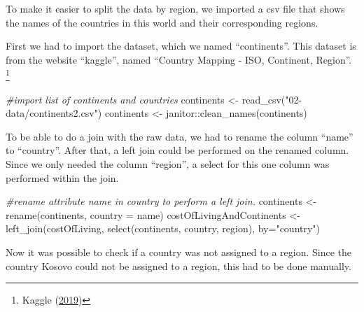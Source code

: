 \documentclass[
  11pt,
  a4paper,
  twoside]{scrbook}
\newenvironment{Shaded}{\begin{snugshade}}{\end{snugshade}}
\newcommand{\AttributeTok}[1]{\textcolor[rgb]{0.77,0.63,0.00}{#1}}
\newcommand{\CommentTok}[1]{\textcolor[rgb]{0.56,0.35,0.01}{\textit{#1}}}
\newcommand{\FunctionTok}[1]{\textcolor[rgb]{0.00,0.00,0.00}{#1}}
\newcommand{\NormalTok}[1]{#1}
\newcommand{\OtherTok}[1]{\textcolor[rgb]{0.56,0.35,0.01}{#1}}
\newcommand{\SpecialCharTok}[1]{\textcolor[rgb]{0.00,0.00,0.00}{#1}}
\newcommand{\StringTok}[1]{\textcolor[rgb]{0.31,0.60,0.02}{#1}}
\begin{document}
\linespread{1}

To make it easier to split the data by region, we imported a csv file that shows the names of the countries in this world and their corresponding regions.

First we had to import the dataset, which we named ``continents''. This dataset is from the website ``kaggle'', named ``Country Mapping - ISO, Continent, Region''. \footnote{Kaggle (\protect\hyperlink{ref-continents2}{2019})}

\linespread{1}

\begin{Shaded}
\begin{Highlighting}[]
\CommentTok{\#import list of continents and countries}
\NormalTok{continents }\OtherTok{\textless{}{-}} \FunctionTok{read\_csv}\NormalTok{(}\StringTok{"02{-}data/continents2.csv"}\NormalTok{)}
\NormalTok{continents }\OtherTok{\textless{}{-}}\NormalTok{ janitor}\SpecialCharTok{::}\FunctionTok{clean\_names}\NormalTok{(continents)}
\end{Highlighting}
\end{Shaded}

\linespread{1}

To be able to do a join with the raw data, we had to rename the column ``name'' to ``country''. After that, a left join could be performed on the renamed column. Since we only needed the column ``region'', a select for this one column was performed within the join.

\linespread{1}

\begin{Shaded}
\begin{Highlighting}[]
\CommentTok{\#rename attribute \textquotesingle{}name\textquotesingle{} in \textquotesingle{}country\textquotesingle{} to perform a left join.}
\NormalTok{continents }\OtherTok{\textless{}{-}} \FunctionTok{rename}\NormalTok{(continents, }\AttributeTok{country =}\NormalTok{ name)}
\NormalTok{costOfLivingAndContinents }\OtherTok{\textless{}{-}} \FunctionTok{left\_join}\NormalTok{(costOfLiving, }\FunctionTok{select}\NormalTok{(continents, country, region), }\AttributeTok{by=}\StringTok{"country"}\NormalTok{)}
\end{Highlighting}
\end{Shaded}

\linespread{1}

Now it was possible to check if a country was not assigned to a region.
Since the country Kosovo could not be assigned to a region, this had to be done manually.
\end{document}
